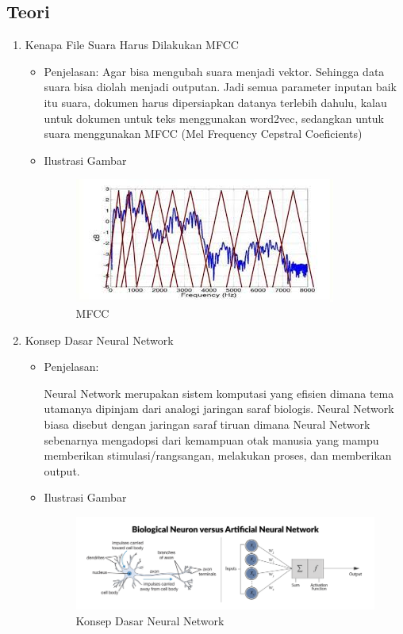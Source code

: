 \subsection{Teori}
\begin{enumerate}
\item Kenapa File Suara Harus Dilakukan MFCC
\begin{itemize}
\item Penjelasan: Agar bisa mengubah suara menjadi vektor. Sehingga data suara bisa diolah menjadi outputan. Jadi semua parameter inputan baik itu suara, dokumen harus dipersiapkan datanya terlebih dahulu, kalau untuk dokumen untuk teks menggunakan word2vec, sedangkan untuk suara menggunakan MFCC (Mel Frequency Cepstral Coeficients) 

\item Ilustrasi Gambar
\begin{figure}[!hbtp]
\centering
\includegraphics[scale=0.7]{figures/andi/61.jpg}
\caption{MFCC}
\label{Contoh 1}
\end{figure}
\end{itemize}


\item Konsep Dasar Neural Network
\begin{itemize}
\item  Penjelasan:
\par Neural Network merupakan sistem komputasi yang efisien dimana tema utamanya dipinjam dari analogi jaringan saraf biologis. Neural Network biasa disebut dengan jaringan saraf tiruan dimana Neural Network sebenarnya mengadopsi dari kemampuan otak manusia yang mampu memberikan stimulasi/rangsangan, melakukan proses, dan memberikan output.

\item Ilustrasi Gambar
\begin{figure}[!hbtp]
\centering
\includegraphics[scale=0.3]{figures/andi/62.png}
\caption{Konsep Dasar Neural Network}
\label{Contoh 2}
\end{figure}


\end{itemize}
\end{enumerate}
